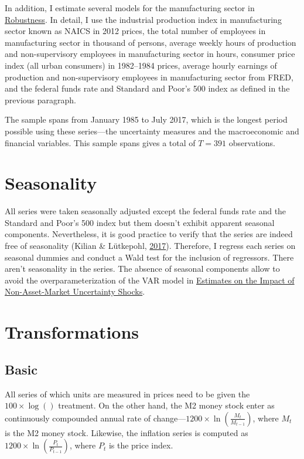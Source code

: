 \documentclass[12pt,twoside]{reedthesis}
\begin{document}
In addition, I estimate several models for the manufacturing sector in \protect\hyperlink{robustness}{Robustness}. In detail, I use the industrial production index in manufacturing sector known as NAICS in 2012 prices, the total number of employees in manufacturing sector in thousand of persons, average weekly hours of production and non-supervisory employees in manufacturing sector in hours, consumer price index (all urban consumers) in 1982--1984 prices, average hourly earnings of production and non-supervisory employees in manufacturing sector from FRED, and the federal funds rate and Standard and Poor's 500 index as defined in the previous paragraph.

The sample spans from January 1985 to July 2017, which is the longest period possible using these series---the uncertainty measures and the macroeconomic and financial variables. This sample spans gives a total of \(T = 391\) observations.

\hypertarget{seasonality}{%
\section{Seasonality}\label{seasonality}}

All series were taken seasonally adjusted except the federal funds rate and the Standard and Poor's 500 index but them doesn't exhibit apparent seasonal components. Nevertheless, it is good practice to verify that the series are indeed free of seasonality (Kilian \& Lütkepohl, \protect\hyperlink{ref-kililutk:2017}{2017}). Therefore, I regress each series on seasonal dummies and conduct a Wald test for the inclusion of regressors. There aren't seasonality in the series. The absence of seasonal components allow to avoid the overparameterization of the VAR model in \protect\hyperlink{estimates-on-the-impact-of-non-asset-market-uncertainty-shocks}{Estimates on the Impact of Non-Asset-Market Uncertainty Shocks}.

\hypertarget{transformations}{%
\section{Transformations}\label{transformations}}

\hypertarget{basic}{%
\subsection{Basic}\label{basic}}

All series of which units are measured in prices need to be given the \(100 \times \log()\) treatment. On the other hand, the M2 money stock enter as continuously compounded annual rate of change---\(1200 \times \ln(\frac{M_{t}}{M_{t - 1}})\), where \(M_{t}\) is the M2 money stock. Likewise, the inflation series is computed as \(1200 \times \ln(\frac{P_{t}}{P_{t - 1}})\), where \(P_{t}\) is the price index.
\end{document}
